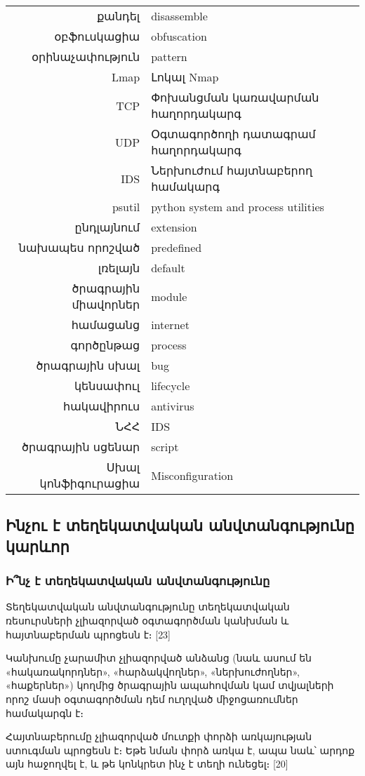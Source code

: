 \documentclass[11pt]{article}
\begin{document}
\begin{sloppypar}
\begin{tabular}{rl}
քանդել&disassemble \\
օբֆուսկացիա&obfuscation \\
օրինաչափություն&pattern \\
Lmap&Լոկալ Nmap \\
TCP&Փոխանցման կառավարման հաղորդակարգ \\
UDP&Օգտագործողի դատագրամ հաղորդակարգ \\
IDS&Ներխուժում հայտնաբերող համակարգ \\
psutil&python system and process utilities \\
ընդլայնում&extension \\
նախապես որոշված&predefined \\
լռելայն&default \\
ծրագրային միավորներ&module \\
համացանց&internet \\
գործընթաց&process \\
ծրագրային սխալ&bug \\
կենսափուլ&lifecycle \\
հակավիրուս&antivirus \\
ՆՀՀ&IDS \\
ծրագրային սցենար&script \\
Սխալ կոնֆիգուրացիա&Misconfiguration \\
\end{tabular}

\subsection{Ինչու է տեղեկատվական անվտանգությունը կարևոր}

\subsubsection{Ի՞նչ է տեղեկատվական անվտանգությունը}

Տեղեկատվական անվտանգությունը տեղեկատվական ռեսուրսների չլիազորված օգտագործման
կանխման և հայտնաբերման պրոցեսն է։ [23]

Կանխումը չարամիտ չլիազորված անձանց (նաև ասում են «հակառակորդներ»,
«հարձակվողներ», «ներխուժողներ», «հաքերներ») կողմից ծրագրային ապահովման կամ
տվյալների որոշ մասի օգտագործման դեմ ուղղված միջոցառումներ համակարգն է։

Հայտնաբերումը չլիազորված մուտքի փորձի առկայության ստուգման պրոցեսն է։ Եթե
նման փորձ առկա է, ապա նաև՝ արդոք այն հաջողվել է, և թե կոնկրետ ինչ է տեղի
ունեցել։ [20]


\end{sloppypar}
\end{document}
